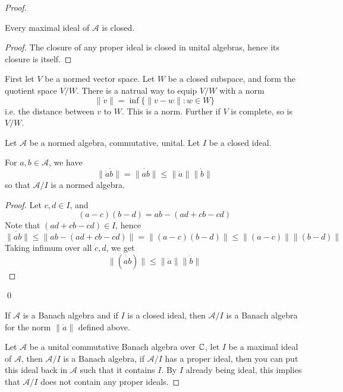 \begin{proof}
    \begin{theorem}
        Every maximal ideal of $\mathcal{A}$ is closed.
    \end{theorem}
        \begin{proof}
        The closure of any proper ideal is closed in unital algebras, hence its closure is itself.
        \end{proof}
    First let $V$ be a normed vector space. Let $W$ be a closed subspace, and form the quotient space $V/W$. There is a natrual way to equip $V/W$ with a norm
    \begin{equation*}
        \|\dot{v}\|=\inf\{\|v-w\|: w\in W \}
    \end{equation*}
    i.e. the distance between $v$ to $W$. This is a norm. Further if $V$ is complete, so is $V/W$.

    Let $\mathcal{A}$ be a normed algebra, commutative, unital. Let $I$ be a closed ideal.
    \begin{proposition}
        For $a,b\in\mathcal{A}$, we have 
        \begin{equation*}
            \|\dot{a}\dot{b}\|=\|\dot{ab}\|\leq \|\dot{a}\|\|\dot{b}\|
        \end{equation*}
        so that $\mathcal{A}/I$ is a normed algebra.
    \end{proposition}
        \begin{proof}
            Let $c,d\in I$, and
            \begin{equation*}
                (a-c)(b-d)=ab-(ad+cb-cd)
            \end{equation*}
            Note that $(ad+cb-cd)\in I$, hence 
            \begin{equation*}
                \|\dot{ab}\|\leq \|ab-(ad+cb-cd)\|=\|(a-c)(b-d)\|\leq\|(a-c)\|\|(b-d)\|
            \end{equation*}
            Taking infimum over all $c,d$, we get
            \begin{equation*}
                \|(\dot{ab})\|\leq\|\dot{a}\|\|\dot{b}\|
            \end{equation*}
        \end{proof}
        \qed

    \begin{proposition}
        If $\mathcal{A}$ is a Banach algebra and if $I$ is a closed ideal, then $\mathcal{A}/I$ is a Banach algebra for the norm $\|\dot{a}\|$ defined above.
    \end{proposition}
    Let $\mathcal{A}$ be a unital commutative Banach algebra over $\mathbb{C}$, let $I$ be a maximal ideal of $\mathcal{A}$, then $\mathcal{A}/I$ is a Banach algebra, if $\mathcal{A}/I$ has a proper ideal, then you can put this ideal back in $\mathcal{A}$ such that it contains $I$. By $I$ already being ideal, this implies that $\mathcal{A}/I$ does not contain any proper ideals.


\end{proof}
